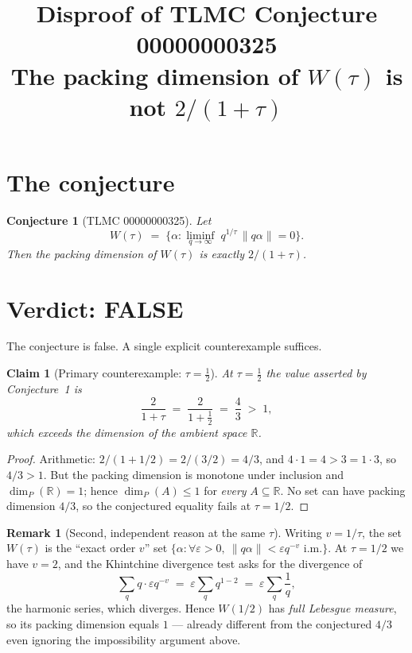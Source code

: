 \documentclass[11pt]{article}
\title{Disproof of TLMC Conjecture 00000000325\\
\large The packing dimension of $W(\tau)$ is not $2/(1+\tau)$}
\author{}
\date{}
\newtheorem{conjecture}{Conjecture}
\newtheorem{claim}{Claim}
\theoremstyle{definition}
\newtheorem{remark}{Remark}
\begin{document}
\maketitle

\section{The conjecture}

\begin{conjecture}[TLMC 00000000325]
Let
\[
W(\tau) \;=\; \bigl\{\alpha : \liminf_{q\to\infty}\; q^{1/\tau}\,\|q\alpha\| = 0\bigr\}.
\]
Then the packing dimension of $W(\tau)$ is exactly $2/(1+\tau)$.
\end{conjecture}

\section{Verdict: FALSE}

The conjecture is false. A single explicit counterexample suffices.

\begin{claim}[Primary counterexample: $\tau = \tfrac12$]
At $\tau = \tfrac12$ the value asserted by Conjecture~1 is
\[
\frac{2}{1+\tau} \;=\; \frac{2}{1+\tfrac12} \;=\; \frac{4}{3} \;>\; 1,
\]
which exceeds the dimension of the ambient space $\mathbb{R}$.
\end{claim}

\begin{proof}
Arithmetic: $2/(1+1/2) = 2/(3/2) = 4/3$, and $4 \cdot 1 = 4 > 3 = 1\cdot 3$,
so $4/3 > 1$. But the packing dimension is monotone under inclusion and
$\dim_P(\mathbb{R}) = 1$; hence $\dim_P(A) \le 1$ for \emph{every}
$A \subseteq \mathbb{R}$. No set can have packing dimension $4/3$, so the
conjectured equality fails at $\tau = 1/2$.
\end{proof}

\begin{remark}[Second, independent reason at the same $\tau$]
Writing $v = 1/\tau$, the set $W(\tau)$ is the ``exact order $v$'' set
$\{\alpha : \forall \varepsilon > 0,\ \|q\alpha\| < \varepsilon q^{-v}
\text{ i.m.}\}$. At $\tau = 1/2$ we have $v = 2$, and the Khintchine
divergence test asks for the divergence of
\[
\sum_{q} q \cdot \varepsilon q^{-v} \;=\; \varepsilon \sum_q q^{1-2}
\;=\; \varepsilon \sum_q \frac1q,
\]
the harmonic series, which diverges. Hence $W(1/2)$ has \emph{full
Lebesgue measure}, so its packing dimension equals $1$ — already
different from the conjectured $4/3$ even ignoring the impossibility
argument above.
\end{remark}
\end{document}

